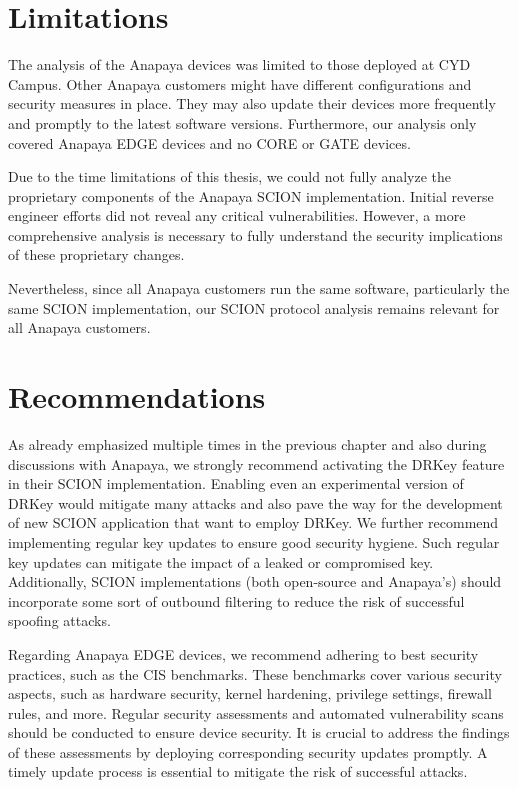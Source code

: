\section{Limitations}
The analysis of the Anapaya devices was limited to those deployed at CYD Campus.
Other Anapaya customers might have different configurations and security measures in place.
They may also update their devices more frequently and promptly to the latest software versions.
Furthermore, our analysis only covered Anapaya EDGE devices and no CORE or GATE devices.

Due to the time limitations of this thesis, we could not fully analyze the proprietary components of the Anapaya SCION implementation.
Initial reverse engineer efforts did not reveal any critical vulnerabilities.
However, a more comprehensive analysis is necessary to fully understand the security implications of these proprietary changes.

Nevertheless, since all Anapaya customers run the same software, particularly the same SCION implementation, our SCION protocol analysis remains relevant for all Anapaya customers.


\section{Recommendations}

As already emphasized multiple times in the previous chapter and also during discussions with Anapaya, we strongly recommend activating the DRKey feature in their SCION implementation.
Enabling even an experimental version of DRKey would mitigate many attacks and also pave the way for the development of new SCION application that want to employ DRKey.
We further recommend implementing regular key updates to ensure good security hygiene.
Such regular key updates can mitigate the impact of a leaked or compromised key.
Additionally, SCION implementations (both open-source and Anapaya's) should incorporate some sort of outbound filtering to reduce the risk of successful spoofing attacks.

Regarding Anapaya EDGE devices, we recommend adhering to best security practices, such as the CIS benchmarks.
These benchmarks cover various security aspects, such as hardware security, kernel hardening, privilege settings, firewall rules, and more.
Regular security assessments and automated vulnerability scans should be conducted to ensure device security.
It is crucial to address the findings of these assessments by deploying corresponding security updates promptly.
A timely update process is essential to mitigate the risk of successful attacks.

